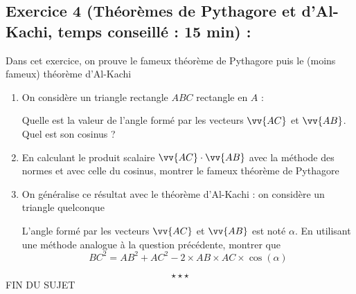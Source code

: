 \subsection*{Exercice 4 (Théorèmes de Pythagore et d'Al-Kachi, temps conseillé : 15 min) : }
Dans cet exercice, on prouve le fameux théorème de Pythagore puis le (moins fameux) théorème d'Al-Kachi
\begin{enumerate}
\item On considère un triangle rectangle $ABC$ rectangle en $A$ : \newline
{}\newline 
Quelle est la valeur de l'angle formé par les vecteurs $\vv{AC}$ et $\vv{AB}$. Quel est son cosinus ?
\item En calculant le produit scalaire $\vv{AC} \cdot \vv{AB}$ avec la méthode des normes et avec celle du cosinus, montrer le fameux théorème de Pythagore
\item On généralise ce résultat avec le théorème d'Al-Kachi : on considère un triangle quelconque 
\newline 
L'angle formé par les vecteurs $\vv{AC}$ et $\vv{AB}$ est noté $\alpha$. En utilisant une méthode analogue à la question précédente, montrer que 
$$BC^2 = AB^2 + AC^2 - 2 \times AB \times AC \times \cos(\alpha)$$
\end{enumerate}
$$\star \star \star$$
\center
FIN DU SUJET
